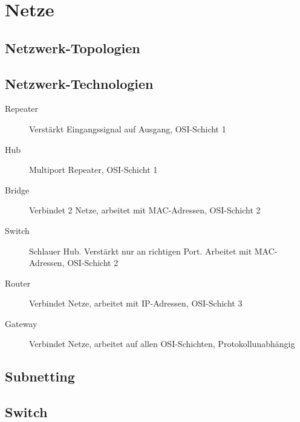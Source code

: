 \documentclass[12pt,a4paper]{article}
\begin{document}
	\section{Netze}
		\subsection{Netzwerk-Topologien}

		\subsection{Netzwerk-Technologien}
			\begin{description}
				\item[Repeater] Verstärkt Eingangssignal auf Ausgang, OSI-Schicht 1
				\item[Hub] Multiport Repeater, OSI-Schicht 1
				\item[Bridge] Verbindet 2 Netze, arbeitet mit MAC-Adressen, OSI-Schicht 2 
				\item[Switch] Schlauer Hub. Verstärkt nur an richtigen Port. Arbeitet mit MAC-Adressen, OSI-Schicht 2 
				\item[Router] Verbindet Netze, arbeitet mit IP-Adressen, OSI-Schicht 3
				\item[Gateway] Verbindet Netze, arbeitet auf allen OSI-Schichten, Protokollunabhängig 
			\end{description}

		\subsection{Subnetting}

		\subsection{Switch}
\end{document}
